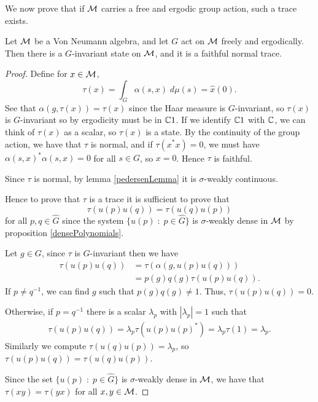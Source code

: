We now prove that if $\mathcal{M}$ carries a free and ergodic group action, such a trace exists.
\begin{lemma}
    Let $\mathcal{M}$ be a Von Neumann algebra, and let $G$ act on $\mathcal{M}$ freely and ergodically.
    Then there is a $G$-invariant state on $\mathcal{M}$, and it is a faithful normal
    trace.
\end{lemma}
\begin{proof}
    Define for $x \in \mathcal{M}$, 
    \begin{equation}
        \tau(x) = \int_G \alpha(s,x)\;d\mu(s) = \hat{x}(0).
    \end{equation}
    See that $\alpha(g,\tau(x)) = \tau(x)$ since the Haar
    measure is $G$-invariant, so $\tau(x)$
    is $G$-invariant so by ergodicity must be in $\mathbb{C} 1$. If we identify
    $\mathbb{C} 1$ with $\mathbb{C}$, we can think of $\tau(x)$ as a scalar, so $\tau(x)$
    is a state. By the continuity of the group action, we have that $\tau$ is normal,
    and if $\tau(x^*x) = 0$, we must have $\alpha(s,x)^*\alpha(s,x) = 0$
    for all $s \in G$, so $x = 0$. Hence $\tau$ is faithful.
    
    Since $\tau$ is normal, by lemma \ref{pedersenLemma} it is $\sigma$-weakly continuous.
    
    Hence to prove that $\tau$ is a trace it is sufficient to prove that
    \begin{equation}
        \tau(u(p)u(q)) = \tau(u(q)u(p))
    \end{equation}
    for all $p,q \in \widehat{G}$ since the system $\{u(p)\;:\; p \in \widehat{G}\}$
    is $\sigma$-weakly dense in $\mathcal{M}$ by proposition \ref{densePolynomials}.
    
    Let $g \in G$, since $\tau$ is $G$-invariant then we have
    \begin{align}
        \tau(u(p)u(q)) &= \tau(\alpha(g,u(p)u(q)))\\
        &= p(g)q(g)\tau(u(p)u(q)).
    \end{align}
    If $p \neq q^{-1}$, we can find $g$ such that $p(g)q(g) \neq 1$. Thus,
    $\tau(u(p)u(q)) = 0$.
    
    Otherwise, if $p = q^{-1}$ there is a scalar $\lambda_p$
    with $|\lambda_p| = 1$ such that
    \begin{align}
        \tau(u(p)u(q)) = \lambda_p\tau(u(p)u(p)^*) = \lambda_p\tau(1) = \lambda_p.
    \end{align}
    Similarly we compute $\tau(u(q)u(p)) = \lambda_p$, so $\tau(u(p)u(q)) = \tau(u(q)u(p))$.
    
    Since the set $\{u(p)\;:\;p \in \widehat{G}\}$ is $\sigma$-weakly
    dense in $\mathcal{M}$, we have that $\tau(xy) = \tau(yx)$ for all $x,y \in \mathcal{M}$.
    
\end{proof} 


